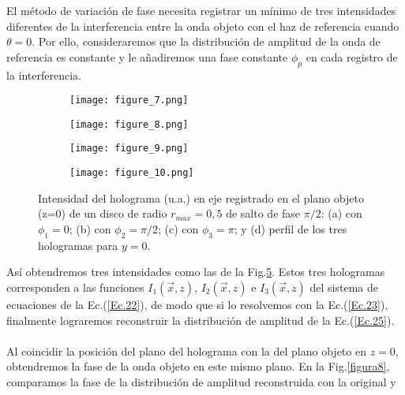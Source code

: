 \documentclass[12pt]{article}
\begin{document}
El método de variación de fase necesita registrar un mínimo de tres intensidades diferentes  de la interferencia entre la onda objeto con el haz de referencia cuando $\theta = 0$. Por ello, consideraremos que la distribución de amplitud de la onda de referencia es constante  y  le añadiremos una fase constante $\phi_{p}$ en cada registro de la  interferencia.
\begin{figure}[tb!]
\centering
    \begin{subfigure}[b]{0.45\textwidth}
        \texttt{[image: figure\_7.png]}
        \caption{}
        \label{f7a}
    \end{subfigure}
    \begin{subfigure}[b]{0.45\textwidth}
        \texttt{[image: figure\_8.png]}
        \caption{}
        \label{f7b}
    \end{subfigure}
    \begin{subfigure}[b]{0.45\textwidth}
        \texttt{[image: figure\_9.png]}
        \caption{}
        \label{f7c}
    \end{subfigure}
    \begin{subfigure}[b]{0.45\textwidth}
        \texttt{[image: figure\_10.png]}
        \caption{}
        \label{f7d}
    \end{subfigure}
    \caption{Intensidad del holograma (u.a.) en eje registrado en el plano objeto (z=0) de un disco de radio $r_{max} = 0,5$ de salto de fase $\pi/2$: (a) con $\phi_1 = 0$; (b) con $\phi_2 = \pi/2$; (c) con $\phi_3 = \pi$; y (d) perfil de los tres hologramas para $y = 0$.}
    \label{figura7}
\end{figure}
Así  obtendremos tres intensidades  como las de la Fig.\ref{figura7}. Estos tres hologramas corresponden a las funciones $I_1(\Vec{x},z)$, $I_2(\vec{x},z)$ e $I_3(\Vec{x},z)$ del sistema de ecuaciones  de la Ec.(\ref{Ec.22}), de modo que si lo resolvemos con la Ec.(\ref{Ec.23}),  finalmente lograremos reconstruir la distribución de amplitud  de la Ec.(\ref{Ec.25}). \\ \\
Al coincidir la posición del plano del holograma con la del plano objeto  en $z = 0$, obtendremos la fase  de la onda objeto en este mismo plano. En la Fig.\ref{figura8}, comparamos la fase de la distribución de amplitud reconstruida con la original y
\end{document}
